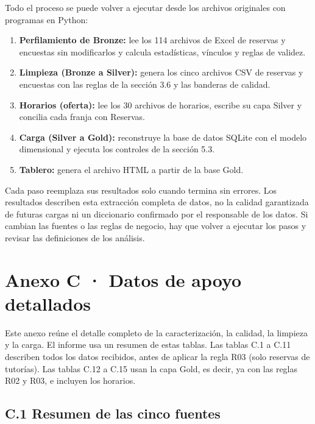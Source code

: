 \documentclass[11pt,letterpaper]{article}
\begin{document}
Todo el proceso se puede volver a ejecutar desde los archivos originales con programas en Python:
\begin{enumerate}[leftmargin=1.5em,itemsep=2pt]
\item \textbf{Perfilamiento de Bronze:} lee los 114 archivos de Excel de reservas y encuestas sin modificarlos y calcula estadísticas, vínculos y reglas de validez.
\item \textbf{Limpieza (Bronze a Silver):} genera los cinco archivos CSV de reservas y encuestas con las reglas de la sección 3.6 y las banderas de calidad.
\item \textbf{Horarios (oferta):} lee los 30 archivos de horarios, escribe su capa Silver y concilia cada franja con Reservas.
\item \textbf{Carga (Silver a Gold):} reconstruye la base de datos SQLite con el modelo dimensional y ejecuta los controles de la sección 5.3.
\item \textbf{Tablero:} genera el archivo HTML a partir de la base Gold.
\end{enumerate}

Cada paso reemplaza sus resultados solo cuando termina sin errores. Los resultados describen esta extracción completa de datos, no la calidad garantizada de futuras cargas ni un diccionario confirmado por el responsable de los datos. Si cambian las fuentes o las reglas de negocio, hay que volver a ejecutar los pasos y revisar las definiciones de los análisis.

\section*{Anexo C · Datos de apoyo detallados}

Este anexo reúne el detalle completo de la caracterización, la calidad, la limpieza y la carga. El informe usa un resumen de estas tablas. Las tablas C.1 a C.11 describen todos los datos recibidos, antes de aplicar la regla R03 (solo reservas de tutorías). Las tablas C.12 a C.15 usan la capa Gold, es decir, ya con las reglas R02 y R03, e incluyen los horarios.

\subsection*{C.1 Resumen de las cinco fuentes}
\end{document}
